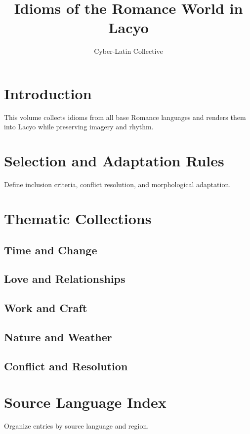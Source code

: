 \documentclass[12pt]{book}
\title{Idioms of the Romance World in Lacyo}
\author{Cyber-Latin Collective}
\date{}
\begin{document}
\maketitle
\tableofcontents

\chapter{Introduction}
This volume collects idioms from all base Romance languages and renders them
into Lacyo while preserving imagery and rhythm.

\chapter{Selection and Adaptation Rules}
Define inclusion criteria, conflict resolution, and morphological adaptation.

\chapter{Thematic Collections}
\section{Time and Change}
\section{Love and Relationships}
\section{Work and Craft}
\section{Nature and Weather}
\section{Conflict and Resolution}

\chapter{Source Language Index}
Organize entries by source language and region.
\end{document}
